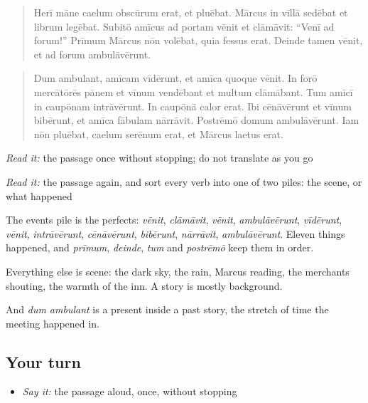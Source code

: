 \begin{tcolorbox}[breakable,skin=enhanced,colback=orange!6,colframe=orange!45!black,boxrule=0.5pt,arc=1mm,left=6pt,right=6pt,top=4pt,bottom=4pt,fonttitle=\bfseries,title={Read this}]
\begin{quote}
Herī māne caelum obscūrum erat, et pluēbat. Mārcus in vīllā sedēbat et librum legēbat. Subitō amīcus ad portam vēnit et clāmāvit: \textquotedblleft{}Venī ad forum!\textquotedblright{} Prīmum Mārcus nōn volēbat, quia fessus erat. Deinde tamen vēnit, et ad forum ambulāvērunt.
\end{quote}

\begin{quote}
Dum ambulant, amīcam vīdērunt, et amīca quoque vēnit. In forō mercātōrēs pānem et vīnum vendēbant et multum clāmābant. Tum amīcī in caupōnam intrāvērunt. In caupōnā calor erat. Ibi cēnāvērunt et vīnum bibērunt, et amīca fābulam nārrāvit. Postrēmō domum ambulāvērunt. Iam nōn pluēbat, caelum serēnum erat, et Mārcus laetus erat.
\end{quote}

\emph{Read it:} the passage once without stopping; do not translate as you go

\emph{Read it:} the passage again, and sort every verb into one of two piles: the scene, or what happened
\end{tcolorbox}

\begin{culture}
The events pile is the perfects: \emph{vēnit}, \emph{clāmāvit}, \emph{vēnit}, \emph{ambulāvērunt}, \emph{vīdērunt}, \emph{vēnit}, \emph{intrāvērunt}, \emph{cēnāvērunt}, \emph{bibērunt}, \emph{nārrāvit}, \emph{ambulāvērunt}. Eleven things happened, and \emph{prīmum}, \emph{deinde}, \emph{tum} and \emph{postrēmō} keep them in order.

Everything else is scene: the dark sky, the rain, Marcus reading, the merchants shouting, the warmth of the inn. A story is mostly background.

And \emph{dum ambulant} is a present inside a past story, the stretch of time the meeting happened in.
\end{culture}

\subsection*{Your turn}
\begin{itemize}
\raggedright
  \item \emph{Say it:} the passage aloud, once, without stopping
\end{itemize}

